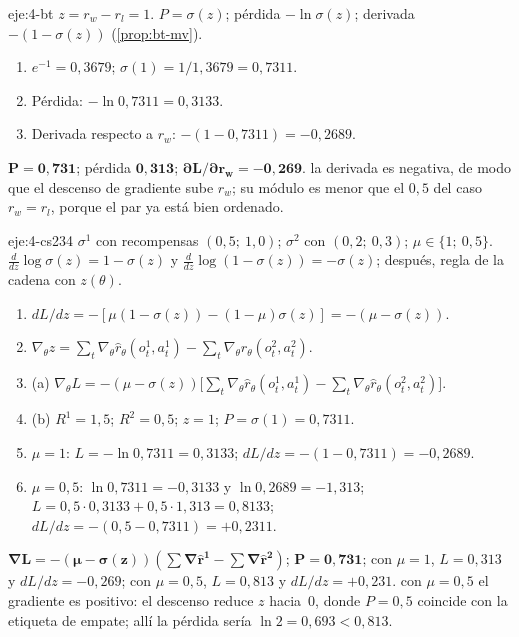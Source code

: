\begin{solucion}{eje:4-bt}
\datos $z=r_w-r_l=1$.
\planteamiento $P=\sigma(z)$; pérdida $-\ln\sigma(z)$; derivada $-(1-\sigma(z))$ (\cref{prop:bt-mv}).
\pasos
\begin{enumerate}[label=\arabic*.]
  \item $e^{-1}=0{,}3679$; $\sigma(1)=1/1{,}3679=0{,}7311$.
  \item Pérdida: $-\ln 0{,}7311=0{,}3133$.
  \item Derivada respecto a $r_w$: $-(1-0{,}7311)=-0{,}2689$.
\end{enumerate}
\resultado $\mathbf{P=0{,}731}$; pérdida $\mathbf{0{,}313}$; $\mathbf{\partial L/\partial r_w=-0{,}269}$.
\comprobacion la derivada es negativa, de modo que el descenso de gradiente sube $r_w$; su módulo es menor que el $0{,}5$ del caso $r_w=r_l$, porque el par ya está bien ordenado.
\end{solucion}

\begin{solucion}{eje:4-cs234}
\datos $\sigma^{1}$ con recompensas $(0{,}5;\ 1{,}0)$; $\sigma^{2}$ con $(0{,}2;\ 0{,}3)$; $\mu\in\{1;\ 0{,}5\}$.
\planteamiento $\frac{d}{dz}\log\sigma(z)=1-\sigma(z)$ y $\frac{d}{dz}\log(1-\sigma(z))=-\sigma(z)$; después, regla de la cadena con $z(\theta)$.
\pasos
\begin{enumerate}[label=\arabic*.]
  \item $dL/dz=-[\mu(1-\sigma(z))-(1-\mu)\sigma(z)]=-(\mu-\sigma(z))$.
  \item $\nabla_\theta z=\sum_t\nabla_\theta\hat r_\theta(o^{1}_t,a^{1}_t)-\sum_t\nabla_\theta\hat r_\theta(o^{2}_t,a^{2}_t)$.
  \item (a) $\nabla_\theta L=-(\mu-\sigma(z))\bigl[\sum_t\nabla_\theta\hat r_\theta(o^{1}_t,a^{1}_t)-\sum_t\nabla_\theta\hat r_\theta(o^{2}_t,a^{2}_t)\bigr]$.
  \item (b) $R^{1}=1{,}5$; $R^{2}=0{,}5$; $z=1$; $P=\sigma(1)=0{,}7311$.
  \item $\mu=1$: $L=-\ln 0{,}7311=0{,}3133$; $dL/dz=-(1-0{,}7311)=-0{,}2689$.
  \item $\mu=0{,}5$: $\ln 0{,}7311=-0{,}3133$ y $\ln 0{,}2689=-1{,}313$; $L=0{,}5\cdot 0{,}3133+0{,}5\cdot 1{,}313=0{,}8133$; $dL/dz=-(0{,}5-0{,}7311)=+0{,}2311$.
\end{enumerate}
\resultado $\mathbf{\nabla L=-(\mu-\sigma(z))(\sum\nabla\hat r^{1}-\sum\nabla\hat r^{2})}$; $\mathbf{P=0{,}731}$; con $\mu=1$, $L=0{,}313$ y $dL/dz=-0{,}269$; con $\mu=0{,}5$, $L=0{,}813$ y $dL/dz=+0{,}231$.
\comprobacion con $\mu=0{,}5$ el gradiente es positivo: el descenso reduce $z$ hacia~0, donde $P=0{,}5$ coincide con la etiqueta de empate; allí la pérdida sería $\ln 2=0{,}693<0{,}813$.
\end{solucion}

